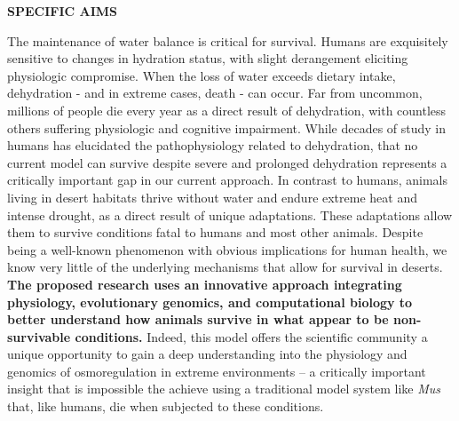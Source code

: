 %
%
%
%
%

\noindent \textbf{SPECIFIC AIMS}

\noindent The maintenance of water balance is critical for survival. Humans are exquisitely sensitive to changes in hydration status, with slight derangement eliciting physiologic compromise. When the loss of water exceeds dietary intake, dehydration - and in extreme cases, death - can occur. Far from uncommon, millions of people die every year as a direct result of dehydration, with countless others suffering physiologic and cognitive impairment. While decades of study in humans has elucidated the pathophysiology related to dehydration, that no current model can survive despite severe and prolonged dehydration represents a critically important gap in our current approach. In contrast to humans, animals living in desert habitats thrive without water and endure extreme heat and intense drought, as a direct result of unique adaptations. These adaptations allow them to survive conditions fatal to humans and most other animals. Despite being a well-known phenomenon with obvious implications for human health, we know very little of the underlying mechanisms that allow for survival in deserts. \textbf{The proposed research uses an innovative approach integrating physiology, evolutionary genomics, and computational biology to better understand how animals survive in what appear to be non-survivable conditions.} Indeed, this model offers the scientific community a unique opportunity to gain a deep understanding into the physiology and genomics of osmoregulation in extreme environments – a critically important insight that is impossible the achieve using a traditional model system like \textit{Mus} that, like humans, die when subjected to these conditions. \\

